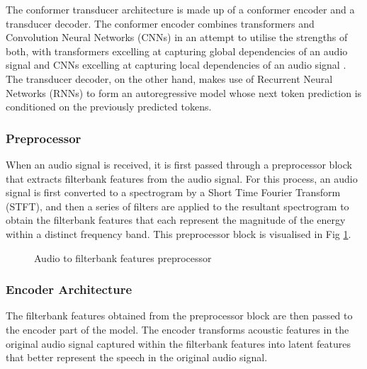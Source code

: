 \documentclass{CSSRforAfrica}
\begin{document}
The conformer transducer architecture is made up of a conformer encoder and a transducer decoder. The conformer encoder combines transformers and Convolution Neural Networks (CNNs) in an attempt to utilise the strengths of both, with transformers excelling at capturing global dependencies of an audio signal and CNNs excelling at capturing local dependencies of an audio signal \cite{gulati_conformer_2020}. The transducer decoder, on the other hand, makes use of Recurrent Neural Networks (RNNs) to form an autoregressive model whose next token prediction is conditioned on the previously predicted tokens.

\subsubsection{Preprocessor}
When an audio signal is received, it is first passed through a preprocessor block that extracts filterbank features from the audio signal. For this process, an audio signal is first converted to a spectrogram by a Short Time Fourier Transform (STFT), and then a series of filters are applied to the resultant spectrogram to obtain the filterbank features that each represent the magnitude of the energy within a distinct frequency band. This preprocessor block is visualised in Fig \ref{fig:preprocessor}.

\begin{figure}[thb]
\begin{center}
\end{center}
\caption{Audio to filterbank features preprocessor}
\label{fig:preprocessor}
\end{figure}

\subsubsection{Encoder Architecture}
The filterbank features obtained from the preprocessor block are then passed to the encoder part of the model. The encoder transforms acoustic features in the original audio signal captured within the filterbank features into latent features that better represent the speech in the original audio signal.
\end{document}
